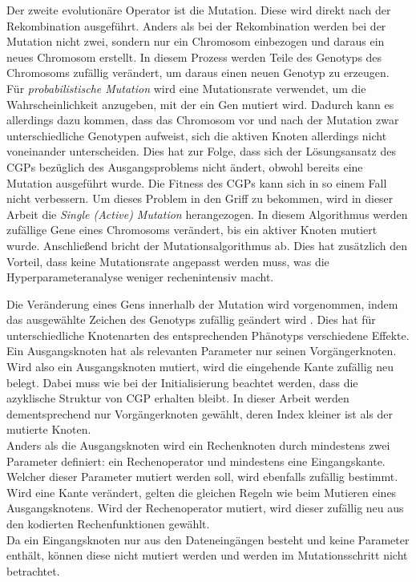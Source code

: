 Der zweite evolutionäre Operator ist die Mutation.
Diese wird direkt nach der Rekombination ausgeführt.
Anders als bei der Rekombination werden bei der Mutation nicht zwei, sondern nur ein Chromosom einbezogen und daraus ein neues Chromosom erstellt.
In diesem Prozess werden Teile des Genotyps des Chromosoms zufällig verändert, um daraus einen neuen Genotyp zu erzeugen. \cite{milad_taleby_ahvanooey_survey_2019}\\
Für \emph{probabilistische Mutation} wird eine Mutationsrate verwendet, um die Wahrscheinlichkeit anzugeben, mit der ein Gen mutiert wird.
Dadurch kann es allerdings dazu kommen, dass das Chromosom vor und nach der Mutation zwar unterschiedliche Genotypen aufweist, sich die aktiven Knoten allerdings nicht voneinander unterscheiden.
Dies hat zur Folge, dass sich der Lösungsansatz des CGPs bezüglich des Ausgangsproblems nicht ändert, obwohl bereits eine Mutation ausgeführt wurde.
Die Fitness des CGPs kann sich in so einem Fall nicht verbessern.
Um dieses Problem in den Griff zu bekommen, wird in dieser Arbeit die \emph{Single (Active) Mutation} herangezogen.
In diesem Algorithmus werden zufällige Gene eines Chromosoms verändert, bis ein aktiver Knoten mutiert wurde.
Anschließend bricht der Mutationsalgorithmus ab. \cite{miller_cartesian_2020}
Dies hat zusätzlich den Vorteil, dass keine Mutationsrate angepasst werden muss, was die Hyperparameteranalyse weniger rechenintensiv macht.

Die Veränderung eines Gens innerhalb der Mutation wird vorgenommen, indem das ausgewählte Zeichen des Genotyps zufällig geändert wird \cite{koza_survey_1995}. 
Dies hat für unterschiedliche Knotenarten des entsprechenden Phänotyps verschiedene Effekte.\\
Ein Ausgangsknoten hat als relevanten Parameter nur seinen Vorgängerknoten.
Wird also ein Ausgangsknoten mutiert, wird die eingehende Kante zufällig neu belegt.
Dabei muss wie bei der Initialisierung beachtet werden, dass die azyklische Struktur von CGP erhalten bleibt.
In dieser Arbeit werden dementsprechend nur Vorgängerknoten gewählt, deren Index kleiner ist als der mutierte Knoten.\\
Anders als die Ausgangsknoten wird ein Rechenknoten durch mindestens zwei Parameter definiert: ein Rechenoperator und mindestens eine Eingangskante.
Welcher dieser Parameter mutiert werden soll, wird ebenfalls zufällig bestimmt.
Wird eine Kante verändert, gelten die gleichen Regeln wie beim Mutieren eines Ausgangsknotens.
Wird der Rechenoperator mutiert, wird dieser zufällig neu aus den kodierten Rechenfunktionen gewählt.\\
Da ein Eingangsknoten nur aus den Dateneingängen besteht und keine Parameter enthält, können diese nicht mutiert werden und werden im Mutationsschritt nicht betrachtet.


